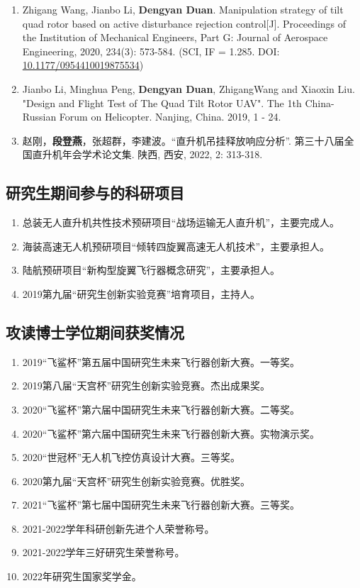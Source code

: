 \begin{enumerate}
  \item Zhigang Wang, Jianbo Li, \textbf{Dengyan Duan}. Manipulation strategy of tilt quad rotor based on active disturbance rejection control[J]. Proceedings of the Institution of Mechanical Engineers, Part G: Journal of Aerospace Engineering, 2020, 234(3): 573-584. (SCI, IF = 1.285. DOI: \href{https://doi.org/10.1177/0954410019875534}{10.1177/0954410019875534})
  \item Jianbo Li, Minghua Peng, \textbf{Dengyan Duan}, ZhigangWang and Xiaoxin Liu. "Design and Flight Test of The Quad Tilt Rotor UAV". The 1th China-Russian Forum on Helicopter. Nanjing, China. 2019, 1 - 24.
  \item 赵刚，\textbf{段登燕}，张超群，李建波。“直升机吊挂释放响应分析”. 第三十八届全国直升机年会学术论文集. 陕西, 西安, 2022, 2: 313-318.
\end{enumerate}

\subsection*{研究生期间参与的科研项目}

\begin{enumerate}
  \item 总装无人直升机共性技术预研项目“战场运输无人直升机”，主要完成人。
  \item 海装高速无人机预研项目“倾转四旋翼高速无人机技术”，主要承担人。
  \item 陆航预研项目“新构型旋翼飞行器概念研究”，主要承担人。
  \item 2019第九届“研究生创新实验竞赛”培育项目，主持人。
\end{enumerate}

\subsection*{攻读博士学位期间获奖情况}
\begin{enumerate}
  \item 2019“飞鲨杯”第五届中国研究生未来飞行器创新大赛。一等奖。
  \item 2019第八届“天宫杯”研究生创新实验竞赛。杰出成果奖。
  \item 2020“飞鲨杯”第六届中国研究生未来飞行器创新大赛。二等奖。
  \item 2020“飞鲨杯”第六届中国研究生未来飞行器创新大赛。实物演示奖。
  \item 2020“世冠杯”无人机飞控仿真设计大赛。三等奖。
  \item 2020第九届“天宫杯”研究生创新实验竞赛。优胜奖。
  \item 2021“飞鲨杯”第七届中国研究生未来飞行器创新大赛。三等奖。
  \item 2021-2022学年科研创新先进个人荣誉称号。
  \item 2021-2022学年三好研究生荣誉称号。
  \item 2022年研究生国家奖学金。
\end{enumerate}
